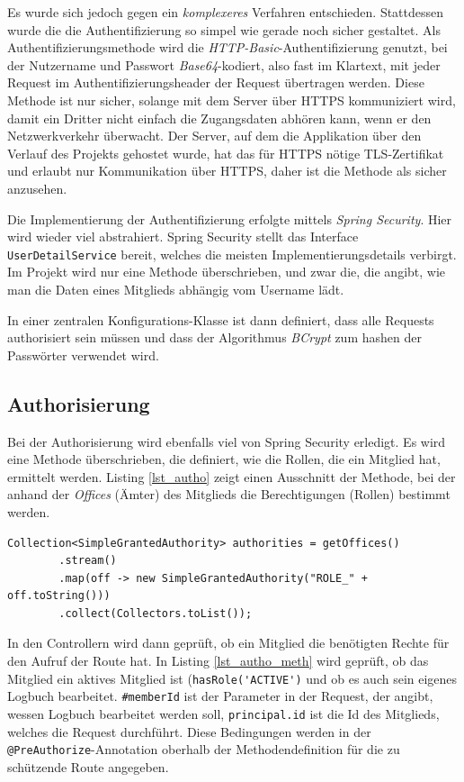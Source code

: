 \documentclass[a4paper, 11pt]{article}
\begin{document}
Es wurde sich jedoch gegen ein \emph{komplexeres} Verfahren entschieden.
Stattdessen wurde die  die Authentifizierung so simpel wie gerade noch sicher
gestaltet. Als Authentifizierungsmethode wird die
\emph{HTTP-Basic}-Au\-then\-ti\-fi\-zie\-rung genutzt, bei der Nutzername und Passwort
\emph{Base64}-kodiert, also fast im Klartext, mit jeder Request im
Authentifizierungsheader der Request übertragen werden. Diese Methode ist nur
sicher, solange mit dem Server über HTTPS kommuniziert wird, damit ein Dritter
nicht einfach die Zugangsdaten abhören kann, wenn er den Netzwerkverkehr überwacht. Der Server, auf dem die
Applikation über den Verlauf des Projekts gehostet wurde, hat das für HTTPS
nötige TLS-Zertifikat und erlaubt nur Kommunikation über HTTPS, daher ist die
Methode als sicher anzusehen.

Die Implementierung der Authentifizierung erfolgte mittels \emph{Spring
Security}. Hier wird wieder viel abstrahiert. Spring Security stellt das
Interface \lstinline{UserDetailService} bereit, welches die meisten
Implementierungsdetails verbirgt. Im Projekt wird nur eine Methode
überschrieben, und zwar die, die angibt, wie man die Daten eines Mitglieds
abhängig vom Username lädt.

In einer zentralen Konfigurations-Klasse ist dann definiert, dass alle Requests
authorisiert sein müssen und dass der Algorithmus \emph{BCrypt} zum hashen der Passwörter verwendet
wird.

\subsection{Authorisierung}

Bei der Authorisierung wird ebenfalls viel von Spring Security erledigt. Es
wird eine Methode überschrieben, die definiert, wie die Rollen, die ein
Mitglied hat, ermittelt werden. Listing \ref{lst_autho} zeigt einen Ausschnitt
der Methode, bei der anhand der \emph{Offices} (Ämter) des Mitglieds die
Berechtigungen (Rollen) bestimmt werden.

\begin{lstlisting}[caption=Bestimmung der Rollen anhand der Ämter, label=lst_autho]
Collection<SimpleGrantedAuthority> authorities = getOffices()
        .stream()
        .map(off -> new SimpleGrantedAuthority("ROLE_" + off.toString()))
        .collect(Collectors.toList());
\end{lstlisting}

In den Controllern wird dann geprüft, ob ein Mitglied die benötigten Rechte
für den Aufruf der Route hat. In Listing \ref{lst_autho_meth} wird geprüft, ob das Mitglied ein aktives
Mitglied ist (\lstinline{hasRole('ACTIVE')} und ob es auch sein eigenes Logbuch
bearbeitet. \lstinline{#memberId} ist der Parameter in der Request, der angibt,
wessen Logbuch bearbeitet werden soll, \lstinline{principal.id} ist die Id des
Mitglieds, welches die Request durchführt. Diese Bedingungen werden in der
\lstinline{@PreAuthorize}-Annotation oberhalb der Methodendefinition für die zu
schützende Route angegeben.
\end{document}
